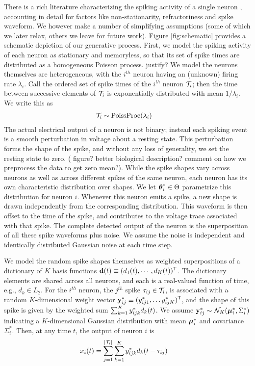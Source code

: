 There is a rich literature characterizing the spiking activity of a single neuron \citep{?}, accounting in detail for factors like non-stationarity, 
refractoriness and spike waveform. We however make a number of simplifying assumptions (some of which we later relax, others we leave
for future work). Figure \ref{fig:schematic} provides a schematic depiction of our generative process.
First, we model the spiking activity of each neuron as stationary and memoryless, so that its set of spike times are 
distributed as a homogeneous Poisson process. 
{\color{red} justify?} We model the neurons themselves are heterogeneous, with the $i^{th}$ neuron having
an (unknown) firing rate $\lambda_i$. Call the ordered set of spike times of the $i^{th}$ neuron $\mathcal{T}_i$; then the time between successive elements of $\mathcal{T}_i$ is 
exponentially distributed with mean $1/\lambda_i$. We write this as
\begin{align}
  \mathcal{T}_i &\sim \text{PoissProc}(\lambda_i)
\end{align}
The actual electrical output of a neuron is not binary; instead each spiking event is a smooth perturbation in voltage about a
resting state. This perturbation forms the shape of the spike, and without any loss of generality, we set the resting state to zero. 
{(\color{red} figure? better biological description? comment on how we preprocess the data to get zero mean?)}. 
While the spike shapes vary across neurons as well as across different spikes of the same neuron, each 
neuron has its own characteristic distribution over shapes. 
We let $\boldsymbol{\theta}^*_i \in \Theta$ parametrize this distribution for neuron $i$.
Whenever this neuron emits a 
spike, a new shape is drawn independently from the corresponding distribution. %
This waveform is then offset to the time of the spike, and contributes to the voltage trace associated with that spike. The complete detected output of the neuron is the 
superposition of all these spike waveforms plus noise.  
We assume the noise is independent and  identically distributed Gaussian noise at each time step.

We model the random spike shapes themselves as weighted superpositions of a dictionary of $K$ basis functions $\mathbf{d}(t) \equiv (d_1(t), \cdots, d_K(t))^{\mathsf{T}}$. The
dictionary elements are shared across all neurons, and each is a real-valued function of time, e.g., $d_k \in L_2$.
For the $i^{th}$ neuron, the $j^{th}$ spike $\tau_{ij} \in \mathcal{T}_i$, is associated with a random $K$-dimensional weight vector $\mathbf{y}^*_{ij} \equiv (y^*_{ij1}, \ldots y^*_{ijK})^{\mathsf{T}}$, and the 
shape of this spike is given by the weighted sum $\sum_{k=1}^K y^*_{ijk} d_k(t)$. We assume $\mathbf{y}^*_{ij} \sim \mathcal{N}_K(\boldsymbol{\mu}^*_i, \Sigma^*_i)$ indicating a $K$-dimensional Gaussian distribution with mean $\boldsymbol{\mu}^*_i$ and covariance $\Sigma^*_i$.   Then, at any time $t$, the output of neuron $i$ is
\begin{align}
  x_{i}(t) &= \sum_{j=1}^{|\mathcal{T}_i|} \sum_{k=1}^K y^*_{ijk} d_k(t - \tau_{ij})
\end{align}



